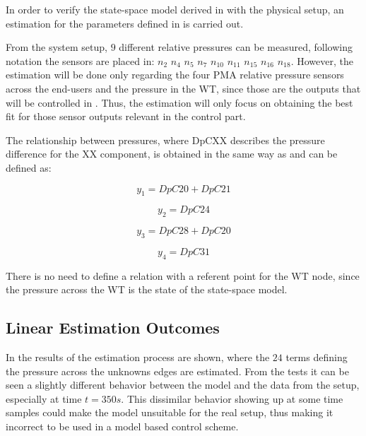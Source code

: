In order to verify the state-space model derived in  with the physical setup, an estimation for the parameters defined in 
is carried out.

From the system setup, $9$ different relative pressures can be measured, following  notation the sensors are placed in: 
$n_2$ $n_4$ $n_5$ $n_7$ $n_{10}$ $n_{11}$ $n_{15}$ $n_{16}$ $n_{18}$. However, the estimation will be done only regarding the four PMA relative pressure 
sensors across the end-users and the pressure in the WT, since those are the outputs that will be controlled in . Thus, the estimation will only focus on obtaining the best fit for those sensor outputs relevant in the control part. 

The relationship between pressures, where DpCXX describes the pressure difference for the XX component, is obtained in the same way as  and can be defined as:

\vspace{4mm}
\begin {equation}
     y_1 = DpC20 + DpC21  
\end{equation}

\vspace{4mm}
\begin {equation}
     y_2 = DpC24
\end{equation}


\vspace{4mm}
\begin {equation}
     y_3 = DpC28 + DpC20 
\end{equation}

\vspace{4mm}
\begin {equation}
     y_4 = DpC31 
\end{equation}

There is no need to define a relation with a referent point for the WT node, since the pressure across the WT is the state of the state-space model. 

\subsection{Linear Estimation Outcomes}
In  the results of the estimation process are shown, where the $24$ terms defining the pressure across the unknowns edges are estimated.
From the tests it can be seen a slightly different behavior between the model and the data from the setup, especially at time $t = 350s$. This dissimilar 
behavior showing up at some time samples could make the model unsuitable for the real setup, thus making it incorrect to be used in a model based control scheme. 

